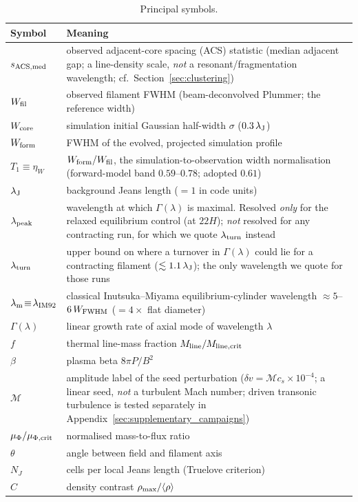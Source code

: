 \documentclass[usenatbib,twoside,twocolumn]{mnras}
\begin{document}
\begin{table}
\caption{Principal symbols.}
\label{tab:symbols}
\footnotesize
\setlength{\tabcolsep}{4pt}
\begin{tabular}{lp{6.1cm}}
\toprule
Symbol & Meaning \\
\midrule
$s_{\rm ACS,med}$ & observed adjacent-core spacing (ACS) statistic (median adjacent gap; a line-density scale, \emph{not} a resonant/fragmentation wavelength; cf.\ Section~\ref{sec:clustering}) \\
$W_{\rm fil}$ & observed filament FWHM (beam-deconvolved Plummer; the reference width) \\
$W_{\rm core}$ & simulation initial Gaussian half-width $\sigma$ ($0.3\,\lambda_{\rm J}$) \\
$W_{\rm form}$ & FWHM of the evolved, projected simulation profile \\
$T_1\!\equiv\!\eta_W$ & $W_{\rm form}/W_{\rm fil}$, the simulation-to-observation width normalisation (forward-model band $0.59$--$0.78$; adopted $0.61$) \\
$\lambda_{\rm J}$ & background Jeans length ($=1$ in code units) \\
$\lambda_{\rm peak}$ & wavelength at which $\Gamma(\lambda)$ is maximal. Resolved \emph{only} for the relaxed equilibrium control (at $22H$); \emph{not} resolved for any contracting run, for which we quote $\lambda_{\rm turn}$ instead \\
$\lambda_{\rm turn}$ & upper bound on where a turnover in $\Gamma(\lambda)$ could lie for a contracting filament ($\lesssim1.1\,\lambda_{\rm J}$); the only wavelength we quote for those runs \\
$\lambda_{\rm m}\!\equiv\!\lambda_{\rm IM92}$ & classical Inutsuka--Miyama equilibrium-cylinder wavelength $\approx5$--$6\,W_{\rm FWHM}$ ($=4\times$ flat diameter) \\
$\Gamma(\lambda)$ & linear growth rate of axial mode of wavelength $\lambda$ \\
$f$ & thermal line-mass fraction $M_{\rm line}/M_{\rm line,crit}$ \\
$\beta$ & plasma beta $8\pi P/B^2$ \\
$\mathcal{M}$ & amplitude label of the seed perturbation ($\delta v=\mathcal{M}c_s\times10^{-4}$; a linear seed, \emph{not} a turbulent Mach number; driven transonic turbulence is tested separately in Appendix~\ref{sec:supplementary_campaigns}) \\
$\mu_\Phi/\mu_{\Phi,\rm crit}$ & normalised mass-to-flux ratio \\
$\theta$ & angle between field and filament axis \\
$N_J$ & cells per local Jeans length (Truelove criterion) \\
$C$ & density contrast $\rho_{\rm max}/\langle\rho\rangle$ \\
\bottomrule
\end{tabular}
\end{table}
\end{document}
